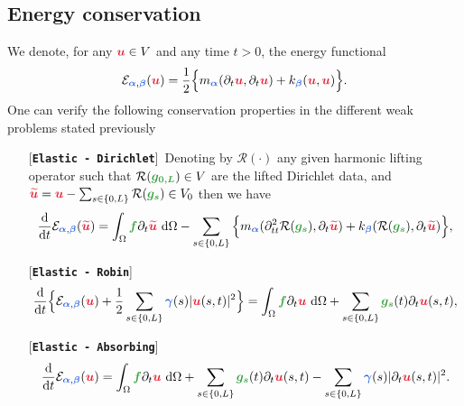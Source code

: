 \documentclass[11pt,a4paper]{article}
\newcommand{\unknown}[1]{\bm{{\color{myred}{#1}}}}
\newcommand{\param}[1]{\bm{{\color{myhyperblue}{#1}}}}
\newcommand{\data}[1]{\bm{{\color{mygreen}{#1}}}}
\newcommand{\keyword}[1]{[\texttt{\textbf{#1}}]\!\,}
\begin{document}
\subsection{Energy conservation}

We denote, for any $\unknown{u}\in V$ and any time $t > 0$, the energy functional
\begin{equation*}
\mathcal{E}_{\param{\alpha},\param{\beta}}(\unknown{u}) = \dfrac{1}{2}\Big\{m_{\param{\alpha}}(\partial_t \unknown{u}, \partial_t \unknown{u}) +  k_{\param{\beta}}(\unknown{u}, \unknown{u})\Big\}.
\end{equation*}
One can verify the following conservation properties in the different weak problems stated previously
\begin{itemize}
\item[] \keyword{Elastic - Dirichlet} Denoting by $\mathcal{R}(\cdot)$ any given harmonic lifting operator such that $\mathcal{R}(\data{g_{0, L}}) \in V$ are the lifted Dirichlet data, and $\unknown{\widetilde{u}} = \unknown{u} - \sum_{s\in\{0, L\}}\mathcal{R}(\data{g_{s}}) \in V_0$ then we have
\begin{equation*}
\dfrac{\mathrm{d}}{\mathrm{d}t} \mathcal{E}_{\param{\alpha},\param{\beta}}(\unknown{\widetilde{u}}) = \int_\Omega \data{f}\partial_t \unknown{\widetilde{u}}~\mathrm{d}\Omega -\sum_{s\in\{0, L\}}  \Big\{m_{\param{\alpha}}(\partial^2_{tt} \mathcal{R}(\data{g_{s}}), \partial_t \unknown{\widetilde{u}}) + k_{\param{\beta}}(\mathcal{R}(\data{g_{s}}), \partial_t \unknown{\widetilde{u}})\Big\},
\end{equation*}
\item[] \keyword{Elastic - Robin}
\begin{equation*}
\dfrac{\mathrm{d}}{\mathrm{d}t}\Big\{\mathcal{E}_{\param{\alpha},\param{\beta}}(\unknown{u}) +  \dfrac{1}{2}\sum_{s\in\{0, L\}}\param{\gamma}(s)|\unknown{u}(s, t)|^2 \Big\} = \int_\Omega \data{f}\partial_t \unknown{u}~\mathrm{d}\Omega + \sum_{s\in\{0, L\}}\data{g_s}(t)\partial_t\unknown{u}(s, t),
\end{equation*}
\item[] \keyword{Elastic - Absorbing}
\begin{equation*}
\dfrac{\mathrm{d}}{\mathrm{d}t} \mathcal{E}_{\param{\alpha},\param{\beta}}(\unknown{u}) = \int_\Omega \data{f}\partial_t \unknown{u}~\mathrm{d}\Omega + \sum_{s\in\{0, L\}}\data{g_s}(t)\partial_t\unknown{u}(s, t) - \sum_{s\in\{0, L\}}\param{\gamma}(s)|\partial_t\unknown{u}(s, t)|^2.
\end{equation*}
\end{itemize}
\end{document}
